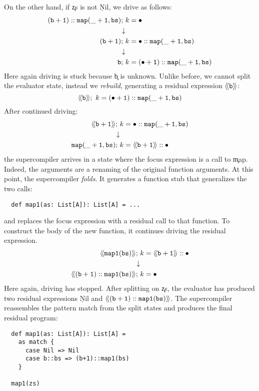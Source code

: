 On the other hand, if \c{zs} is not \c{Nil}, we drive as follows:
    \begin{align*}
       \c{(b+1)::map(\_+1, bs)};~& k = \bullet \\
       \downarrow&\\
       \c{(b+1)};~& k = \c{\bullet::map(\_+1, bs)} \\
       \downarrow&\\
       \c{b};~& k = \c{(\bullet+1)::map(\_+1, bs)} 
    \end{align*}
Here again driving is stuck because \c{b} is unknown.
Unlike before, we cannot split the evaluator state, instead we \emph{rebuild},
generating a residual
expression $\R{\c{b}}$:
       \[
       \R{\c{b}};~ k = \c{(\bullet+1)::map(\_+1, bs)}
     \]
After continued driving:
    \begin{align*}
       \R{\c{b+1}};~& k = \c{\bullet::map(\_+1, bs)} \\
       \downarrow&\\
       \c{map(\_+1, bs)};~& k = \c{\R{b+1}::\bullet} 
    \end{align*}
the supercompiler arrives in a state where
the focus expression is a call to \c{map}.
Indeed, the arguments are a renaming of the original function arguments.
At this point, the supercompiler \emph{folds}.
It generates a function stub that generalizes the two calls:
\begin{verbatim}
  def map1(as: List[A]): List[A] = ...
\end{verbatim}
and replaces the focus expression with a residual call to that function.
To construct the body of the new function, it continues driving the residual
expression.
    \begin{align*}
      \c{\R{map1(bs)}};~& k = \c{\R{b+1}::\bullet} \\
       \downarrow&\\
      \c{\R{(b+1)::map1(bs)}};~& k = \bullet 
    \end{align*}
Here again, driving has stopped.
After splitting on \c{zs}, the evaluator has produced two residual expressions
\c{Nil} and $\c{\R{(b+1)::map1(bs)}}$.
The supercompiler reassembles the pattern match from the split states and produces 
the final residual program:
\begin{verbatim}
  def map1(as: List[A]): List[A] =
    as match {
      case Nil => Nil
      case b::bs => (b+1)::map1(bs)
    }

  map1(zs)
\end{verbatim}

